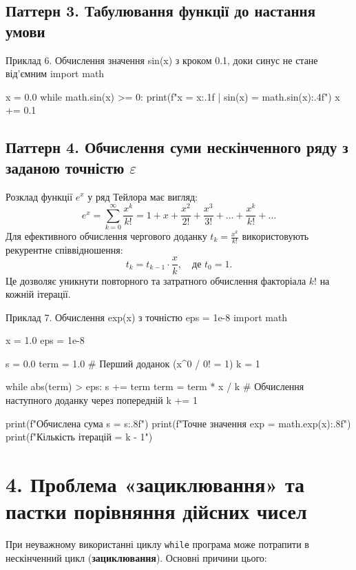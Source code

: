 \documentclass{scrreprt}
\begin{document}
	\subsection*{Паттерн 3. Табулювання функції до настання умови}
	
	\begin{py}{Приклад 6. Обчислення значення sin(x) з кроком 0.1, доки синус не стане від'ємним}
import math

x = 0.0
while math.sin(x) >= 0:
    print(f"x = {x:.1f} | sin(x) = {math.sin(x):.4f}")
    x += 0.1
	\end{py}
	
	\subsection*{Паттерн 4. Обчислення суми нескінченного ряду з заданою точністю $\varepsilon$}
	
	Розклад функції $e^x$ у ряд Тейлора має вигляд:
	$$
	e^x = \sum_{k=0}^{\infty} \frac{x^k}{k!} = 1 + x + \frac{x^2}{2!} + \frac{x^3}{3!} + \dots + \frac{x^k}{k!} + \dots
	$$
	Для ефективного обчислення чергового доданку $t_k = \frac{x^k}{k!}$ використовують рекурентне співвідношення:
	$$
	t_k = t_{k-1} \cdot \frac{x}{k}, \quad \text{де } t_0 = 1.
	$$
	Це дозволяє уникнути повторного та затратного обчислення факторіала $k!$ на кожній ітерації.
	
	\begin{py}{Приклад 7. Обчислення exp(x) з точністю eps = 1e-8}
import math

x = 1.0
eps = 1e-8

s = 0.0
term = 1.0  # Перший доданок (x^0 / 0! = 1)
k = 1

while abs(term) > eps:
    s += term
    term = term * x / k  # Обчислення наступного доданку через попередній
    k += 1

print(f"Обчислена сума s  = {s:.8f}")
print(f"Точне значення exp = {math.exp(x):.8f}")
print(f"Кількість ітерацій  = {k - 1}")
	\end{py}
	
	\newpage
	
	\section*{4. Проблема «зациклювання» та пастки порівняння дійсних чисел}
	
	При неуважному використанні циклу \texttt{while} програма може потрапити в нескінченний цикл (\textbf{зациклювання}). Основні причини цього:
	
\end{document}
